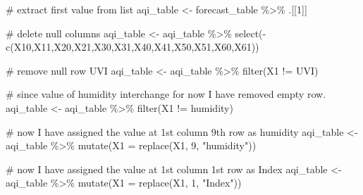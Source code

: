 \documentclass[
]{article}
\newenvironment{Shaded}{}{}
\newcommand{\AttributeTok}[1]{#1}
\newcommand{\CommentTok}[1]{\textcolor[rgb]{0.30,0.53,0.42}{#1}}
\newcommand{\DecValTok}[1]{\textcolor[rgb]{0.00,0.00,0.80}{#1}}
\newcommand{\FunctionTok}[1]{#1}
\newcommand{\NormalTok}[1]{#1}
\newcommand{\OtherTok}[1]{\textcolor[rgb]{1.00,0.25,0.00}{#1}}
\newcommand{\SpecialCharTok}[1]{\textcolor[rgb]{0.00,0.50,0.50}{#1}}
\newcommand{\StringTok}[1]{\textcolor[rgb]{0.01,0.42,0.03}{#1}}
\begin{document}
\begin{Shaded}
\begin{Highlighting}[]
\CommentTok{\# extract first value from list}
\NormalTok{aqi\_table }\OtherTok{\textless{}{-}}\NormalTok{ forecast\_table }\SpecialCharTok{\%\textgreater{}\%}\NormalTok{ .[[}\DecValTok{1}\NormalTok{]]}

\CommentTok{\# delete null columns}
\NormalTok{aqi\_table }\OtherTok{\textless{}{-}}\NormalTok{ aqi\_table }\SpecialCharTok{\%\textgreater{}\%} 
  \FunctionTok{select}\NormalTok{(}\SpecialCharTok{{-}}\FunctionTok{c}\NormalTok{(}\StringTok{\textquotesingle{}X10\textquotesingle{}}\NormalTok{,}\StringTok{\textquotesingle{}X11\textquotesingle{}}\NormalTok{,}\StringTok{\textquotesingle{}X20\textquotesingle{}}\NormalTok{,}\StringTok{\textquotesingle{}X21\textquotesingle{}}\NormalTok{,}\StringTok{\textquotesingle{}X30\textquotesingle{}}\NormalTok{,}\StringTok{\textquotesingle{}X31\textquotesingle{}}\NormalTok{,}\StringTok{\textquotesingle{}X40\textquotesingle{}}\NormalTok{,}\StringTok{\textquotesingle{}X41\textquotesingle{}}\NormalTok{,}\StringTok{\textquotesingle{}X50\textquotesingle{}}\NormalTok{,}\StringTok{\textquotesingle{}X51\textquotesingle{}}\NormalTok{,}\StringTok{\textquotesingle{}X60\textquotesingle{}}\NormalTok{,}\StringTok{\textquotesingle{}X61\textquotesingle{}}\NormalTok{))}

\CommentTok{\# remove null row \textquotesingle{}UVI\textquotesingle{}}
\NormalTok{aqi\_table }\OtherTok{\textless{}{-}}\NormalTok{ aqi\_table }\SpecialCharTok{\%\textgreater{}\%} \FunctionTok{filter}\NormalTok{(X1 }\SpecialCharTok{!=} \StringTok{\textquotesingle{}UVI\textquotesingle{}}\NormalTok{)}

\CommentTok{\# since value of humidity interchange for now I have removed empty row.}
\NormalTok{aqi\_table }\OtherTok{\textless{}{-}}\NormalTok{ aqi\_table }\SpecialCharTok{\%\textgreater{}\%} \FunctionTok{filter}\NormalTok{(X1 }\SpecialCharTok{!=} \StringTok{\textquotesingle{}humidity\textquotesingle{}}\NormalTok{)}

\CommentTok{\# now I have assigned the value at 1st column 9th row as \textquotesingle{}humidity\textquotesingle{}}
\NormalTok{aqi\_table }\OtherTok{\textless{}{-}}\NormalTok{ aqi\_table }\SpecialCharTok{\%\textgreater{}\%} \FunctionTok{mutate}\NormalTok{(}\AttributeTok{X1 =} \FunctionTok{replace}\NormalTok{(X1, }\DecValTok{9}\NormalTok{, }\StringTok{"humidity"}\NormalTok{))}

\CommentTok{\# now I have assigned the value at 1st column 1st row as \textquotesingle{}Index\textquotesingle{}}
\NormalTok{aqi\_table }\OtherTok{\textless{}{-}}\NormalTok{ aqi\_table }\SpecialCharTok{\%\textgreater{}\%} \FunctionTok{mutate}\NormalTok{(}\AttributeTok{X1 =} \FunctionTok{replace}\NormalTok{(X1, }\DecValTok{1}\NormalTok{, }\StringTok{"Index"}\NormalTok{))}


\end{Highlighting}
\end{Shaded}
\end{document}
